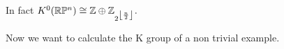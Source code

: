 \begin{example}

	\end{example}


	\begin{fact}
		In fact $K^0(\mathbb{R}\mathbb{P}^n)\cong \mathbb{Z} \oplus \mathbb{Z}_{2^{\left\lfloor \frac{n}{2}\right\rfloor}}.$ 
	\end{fact}

	Now we want to calculate the K group of a non trivial example.
	
